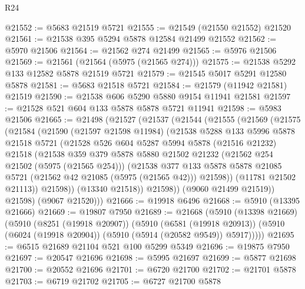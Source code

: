 \begin{lexlean}{R24}
\begin{coremodule}
@21552 := @5683 @21519 @5721
@21555 := @21549 (@21550 @21552) @21520
@21561 := @21538 @395 @5294 @5878 @12584 @21499 @21552
@21562 := @5970 @21506
@21564 := @21562 @274 @21499
@21565 := @5976 @21506
@21569 := @21561 (@21564 (@5975 (@21565 @274)))
@21575 := @21538 @5292 @133 @12582 @5878 @21519 @5721
@21579 := @21545 @5017 @5291 @12580 @5878
@21581 := @5683 @21518 @5721
@21584 := @21579 (@11942 @21581) @21519
@21590 := @21538 @606 @5290 @5880 @9154 @11941 @21581
@21597 := @21528 @521 @604 @133 @5878 @5878 @5721 @11941
@21598 := @5983 @21506
@21665 := @21498
    (@21527
      (@21537
        (@21544
          (@21555
            (@21569
              (@21575
                (@21584
                  (@21590
                    (@21597 @21598 @11984)
                    (@21538
                      @5288
                      @133
                      @5996
                      @5878
                      @21518
                      @5721
                      (@21528
                        @526
                        @604
                        @5287
                        @5994
                        @5878
                        (@21516 @21232)
                        @21518
                        (@21538
                          @359
                          @379
                          @5878
                          @5880
                          @21502
                          @21232
                          (@21562 @254 @21502 (@5975 (@21565 @254)))
                          (@21538
                            @377
                            @133
                            @5878
                            @5878
                            @21085
                            @5721
                            (@21562 @42 @21085 (@5975 (@21565 @42)))
                            @21598))
                        (@11781 @21502 @21113))
                      @21598))
                  (@13340 @21518))
                @21598))
            (@9060 @21499 @21519))
          @21598)
        (@9067 @21520)))
@21666 := @19918 @6496
@21668 := @5910 (@13395 @21666)
@21669 := @19807 @7950
@21689 := @21668
    (@5910
      (@13398 @21669)
      (@5910
        (@8251 (@19918 @20907))
        (@5910
          (@6581 (@19918 @20913))
          (@5910 (@6024 (@19918 @20904)) (@5910 (@5914 (@20582 @9549)) @5917)))))
@21695 := @6515 @21689 @21104 @521 @100 @5299 @5349
@21696 := @19875 @7950
@21697 := @20547 @21696
@21698 := @5995 @21697
@21699 := @5877 @21698
@21700 := @20552 @21696
@21701 := @6720 @21700
@21702 := @21701 @5878
@21703 := @6719 @21702
@21705 := @6727 @21700 @5878

\end{coremodule}
\end{lexlean}
